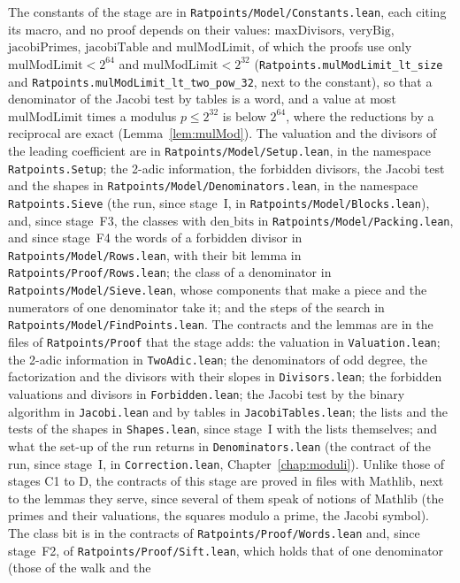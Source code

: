 The constants of the stage are in \verb|Ratpoints/Model/Constants.lean|, each citing its macro, and
no proof depends on their values: $\mathrm{maxDivisors}$, $\mathrm{veryBig}$,
$\mathrm{jacobiPrimes}$, $\mathrm{jacobiTable}$ and $\mathrm{mulModLimit}$, of which the proofs use
only $\mathrm{mulModLimit} < 2^{64}$ and $\mathrm{mulModLimit} < 2^{32}$
(\verb|Ratpoints.mulModLimit_lt_size| and \verb|Ratpoints.mulModLimit_lt_two_pow_32|, next to the
constant), so that a denominator of the Jacobi test by tables is a word, and a value at most
$\mathrm{mulModLimit}$ times a modulus $p \le 2^{32}$ is below $2^{64}$, where the reductions by a
reciprocal are exact (Lemma~\ref{lem:mulMod}). The valuation and the divisors of the leading
coefficient are in \verb|Ratpoints/Model/Setup.lean|, in the namespace \verb|Ratpoints.Setup|; the
2-adic information, the forbidden divisors, the Jacobi test and the shapes in
\verb|Ratpoints/Model/Denominators.lean|, in the namespace \verb|Ratpoints.Sieve| (the run, since
stage~I, in \verb|Ratpoints/Model/Blocks.lean|), and, since stage~F3, the classes with
$\mathrm{den\_bits}$ in \verb|Ratpoints/Model/Packing.lean|, and since stage~F4 the words of a
forbidden divisor in \verb|Ratpoints/Model/Rows.lean|, with their bit lemma in
\verb|Ratpoints/Proof/Rows.lean|; the class of a denominator in \verb|Ratpoints/Model/Sieve.lean|,
whose components that make a piece and the numerators of one denominator take it; and the steps of
the search in \verb|Ratpoints/Model/FindPoints.lean|. The contracts and the lemmas are in the files
of \verb|Ratpoints/Proof| that the stage adds: the valuation in \verb|Valuation.lean|; the 2-adic
information in \verb|TwoAdic.lean|; the denominators of odd degree, the factorization and the
divisors with their slopes in \verb|Divisors.lean|; the forbidden valuations and divisors in
\verb|Forbidden.lean|; the Jacobi test by the binary algorithm in \verb|Jacobi.lean| and by tables
in \verb|JacobiTables.lean|; the lists and the tests of the shapes in \verb|Shapes.lean|, since
stage~I with the lists themselves; and what the set-up of the run returns in
\verb|Denominators.lean| (the contract of the run, since stage~I, in \verb|Correction.lean|,
Chapter~\ref{chap:moduli}). Unlike those of stages C1 to D, the contracts of this stage are proved
in files with Mathlib, next to the lemmas they serve, since several of them speak of notions of
Mathlib (the primes and their valuations, the squares modulo a prime, the Jacobi symbol). The class
bit is in the contracts of \verb|Ratpoints/Proof/Words.lean| and, since stage~F2, of
\verb|Ratpoints/Proof/Sift.lean|, which holds that of one denominator (those of the walk and the
